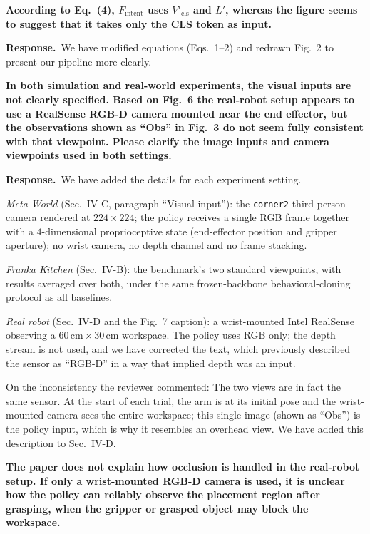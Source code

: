 \documentclass[11pt,a4paper]{article}
\newcommand{\C}[1]{\textbf{#1}\par\vspace{2pt}}
\newcommand{\R}[1]{\textbf{Response.}~#1}
\begin{document}
\begin{qa}
\item \C{According to Eq.~(4), $F_{\mathrm{intent}}$ uses $V'_{\mathrm{cls}}$ and $L'$, whereas the
figure seems to suggest that it takes only the CLS token as input.}
\R{We have modified equations (Eqs.~1--2) and redrawn Fig.~2 to present our pipeline more clearly.}




\item \C{In both simulation and real-world experiments, the visual inputs are not clearly
specified. Based on Fig.~6 the real-robot setup appears to use a RealSense RGB-D camera mounted
near the end effector, but the observations shown as ``Obs'' in Fig.~3 do not seem fully consistent
with that viewpoint. Please clarify the image inputs and camera viewpoints used in both settings.}
\R{We have added the details for each experiment setting.

\emph{Meta-World} (Sec.~IV-C, paragraph ``Visual input''): the \texttt{corner2} third-person camera
rendered at $224\times224$; the policy receives a single RGB frame together with a $4$-dimensional
proprioceptive state (end-effector position and gripper aperture); no wrist camera, no depth
channel and no frame stacking.

\emph{Franka Kitchen} (Sec.~IV-B): the benchmark's two standard viewpoints, with results averaged
over both, under the same frozen-backbone behavioral-cloning protocol as all baselines.

\emph{Real robot} (Sec.~IV-D and the Fig.~7 caption): a wrist-mounted Intel RealSense observing a
$60\,\mathrm{cm}\times30\,\mathrm{cm}$ workspace. The policy uses RGB only; the depth stream is not
used, and we have corrected the text, which previously described the sensor as ``RGB-D'' in a way
that implied depth was an input.

On the inconsistency the reviewer commented: The two views are in fact the same sensor.
At the start of each trial, the arm is at its initial pose and the wrist-mounted camera sees the entire workspace; this single image (shown as ``Obs'') is the policy input, which is why it resembles an overhead view. We have added this description to Sec.~IV-D.}

\item \C{The paper does not explain how occlusion is handled in the real-robot setup. If only a
wrist-mounted RGB-D camera is used, it is unclear how the policy can reliably observe the placement
region after grasping, when the gripper or grasped object may block the workspace.}


\end{qa}
\end{document}
